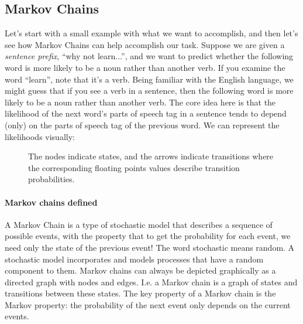 \documentclass[12pt]{article}
\begin{document}
\subsection{Markov Chains} Let's start with a small example with what we want to accomplish, and then let's see how Markov Chains can help accomplish our task. Suppose we are given a \emph{sentence prefix}, ``why not learn...'', and we want to predict whether the following word is more likely to be a noun rather than another verb. If you examine the word ``learn'', note that it's a verb. Being familiar with the English language, we might guess that if you see a verb in a sentence, then the following word is more likely to be a noun rather than another verb. The core idea here is that the likelihood of the next word's parts of speech tag in a sentence tends to depend (only) on the parts of speech tag of the previous word. We can represent the likelihoods visually:
\begin{figure}
  \begin{center}
    \caption{The nodes indicate states, and the arrows indicate transitions where the corresponding floating points values describe transition probabilities.}
  \end{center}
\end{figure}

\paragraph{Markov chains defined}
A Markov Chain is a type of stochastic model that describes a sequence of possible events, with the property that to get the probability for each event, we need only the state of the previous event! The word stochastic means random. A stochastic model incorporates and models processes that have a random component to them. Markov chains can always be depicted graphically as a directed graph with nodes and edges. I.e. a Markov chain is a graph of states and transitions between these states. The key property of a Markov chain is the Markov property: the probability of the next event only depends on the current events.
\end{document}
